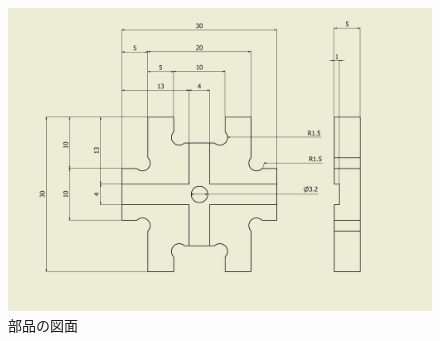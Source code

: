 \documentclass[b5paper, 9pt, twocolumn, titlepage,openany]{jsbook}%
\begin{document}
\clearpage
\begin{figure}[tbh]
  \begin{center}
    \begin{minipage}{2.0\columnwidth}
      \includegraphics[width=\columnwidth]{piece_1_dft2.png}
      \caption{部品の図面    \label{parts_dft}}
    \end{minipage}
  \end{center}
\end{figure}
\end{document}

